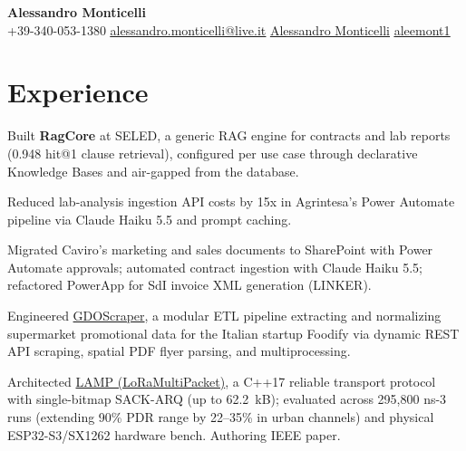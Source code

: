 \documentclass[a4paper,11pt,english]{article}
\begin{document}
\setlength{\footskip}{5pt}
\begin{center}
  \textbf{\Large Alessandro Monticelli} \\ \vspace{3pt}
  {\small{} +39-340-053-1380 \quad
    \href{mailto:alessandro.monticelli@live.it}{{} \underline{alessandro.monticelli@live.it}} \quad
    \href{https://www.linkedin.com/in/ale-mont}{{} \underline{Alessandro Monticelli}} \quad
    \href{https://github.com/aleemont1}{{} \underline{aleemont1}}}
\end{center}
\vspace{-6pt}

\section{Experience}
\resumeSubHeadingListStart
    \resumeItemListStart
        \item\small{Built \textbf{RagCore} at SELED, a generic RAG engine for contracts and lab reports (0.948 hit@1 clause retrieval), configured per use case through declarative Knowledge Bases and air-gapped from the database.}
        \item\small{Reduced lab-analysis ingestion API costs by 15x in Agrintesa's Power Automate pipeline via Claude Haiku 5.5 and prompt caching.}
        \item\small{Migrated Caviro's marketing and sales documents to SharePoint with Power Automate approvals; automated contract ingestion with Claude Haiku 5.5; refactored PowerApp for SdI invoice XML generation (LINKER).}
    \resumeItemListEnd

    \resumeItemListStart
        \item\small{Engineered \href{https://github.com/aleemont1/supermarket-scraper}{GDOScraper}, a modular ETL pipeline extracting and normalizing supermarket promotional data for the Italian startup Foodify via dynamic REST API scraping, spatial PDF flyer parsing, and multiprocessing.}
    \resumeItemListEnd

    \resumeItemListStart
        \item\small{Architected \href{https://github.com/aleemont1/LAMP}{LAMP (LoRaMultiPacket)}, a C++17 reliable transport protocol with single-bitmap SACK-ARQ (up to 62.2~kB); evaluated across 295,800 ns-3 runs (extending 90\% PDR range by 22--35\% in urban channels) and physical ESP32-S3/SX1262 hardware bench. Authoring IEEE paper.}
    \resumeItemListEnd
\end{document}

